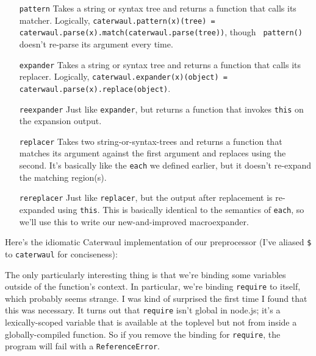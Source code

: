 \documentclass{report}
\begin{document}
\begin{enumerate}
\item[{\tt pattern}]
  Takes a string or syntax tree and returns a function that calls its matcher. Logically, {\tt caterwaul.pattern(x)(tree) = caterwaul.parse(x).match(caterwaul.parse(tree))}, though {\tt
  pattern()} doesn't re-parse its argument every time.

\item[{\tt expander}]
  Takes a string or syntax tree and returns a function that calls its replacer. Logically, {\tt caterwaul.expander(x)(object) = caterwaul.parse(x).replace(object)}.

\item[{\tt reexpander}]
  Just like {\tt expander}, but returns a function that invokes {\tt this} on the expansion output.

\item[{\tt replacer}]
  Takes two string-or-syntax-trees and returns a function that matches its argument against the first argument and replaces using the second. It's basically like the {\tt each} we
  defined earlier, but it doesn't re-expand the matching region(s).

\item[{\tt rereplacer}]
  Just like {\tt replacer}, but the output after replacement is re-expanded using {\tt this}. This is basically identical to the semantics of {\tt each}, so we'll use this to write our
  new-and-improved macroexpander.
\end{enumerate}

    Here's the idiomatic Caterwaul implementation of our preprocessor (I've aliased \verb|$| to {\tt caterwaul} for conciseness):


    The only particularly interesting thing is that we're binding some variables outside of the function's context. In particular, we're binding {\tt require} to itself, which probably seems
    strange. I was kind of surprised the first time I found that this was necessary. It turns out that {\tt require} isn't global in node.js; it's a lexically-scoped variable that is available
    at the toplevel but not from inside a globally-compiled function. So if you remove the binding for {\tt require}, the program will fail with a {\tt ReferenceError}.
\end{document}
